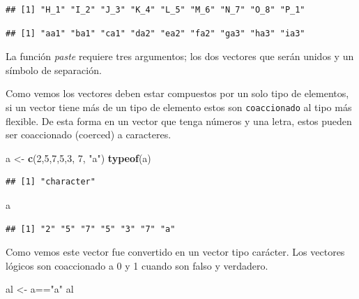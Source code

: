 \documentclass[]{article}
\newenvironment{Shaded}{\begin{snugshade}}{\end{snugshade}}
\newcommand{\KeywordTok}[1]{\textcolor[rgb]{0.13,0.29,0.53}{\textbf{{#1}}}}
\newcommand{\DecValTok}[1]{\textcolor[rgb]{0.00,0.00,0.81}{{#1}}}
\newcommand{\StringTok}[1]{\textcolor[rgb]{0.31,0.60,0.02}{{#1}}}
\newcommand{\NormalTok}[1]{{#1}}
\begin{document}
\begin{verbatim}
## [1] "H_1" "I_2" "J_3" "K_4" "L_5" "M_6" "N_7" "O_8" "P_1"
\end{verbatim}

\begin{verbatim}
## [1] "aa1" "ba1" "ca1" "da2" "ea2" "fa2" "ga3" "ha3" "ia3"
\end{verbatim}

La función \emph{paste} requiere tres argumentos; los dos vectores que
serán unidos y un símbolo de separación.

Como vemos los vectores deben estar compuestos por un solo tipo de
elementos, si un vector tiene más de un tipo de elemento estos son
\texttt{coaccionado} al tipo más flexible. De esta forma en un vector
que tenga números y una letra, estos pueden ser coaccionado (coerced) a
caracteres.

\begin{Shaded}
\begin{Highlighting}[]
\NormalTok{a <-}\StringTok{ }\KeywordTok{c}\NormalTok{(}\DecValTok{2}\NormalTok{,}\DecValTok{5}\NormalTok{,}\DecValTok{7}\NormalTok{,}\DecValTok{5}\NormalTok{,}\DecValTok{3}\NormalTok{, }\DecValTok{7}\NormalTok{, }\StringTok{"a"}\NormalTok{)}
\KeywordTok{typeof}\NormalTok{(a)}
\end{Highlighting}
\end{Shaded}

\begin{verbatim}
## [1] "character"
\end{verbatim}

\begin{Shaded}
\begin{Highlighting}[]
\NormalTok{a}
\end{Highlighting}
\end{Shaded}

\begin{verbatim}
## [1] "2" "5" "7" "5" "3" "7" "a"
\end{verbatim}

Como vemos este vector fue convertido en un vector tipo carácter. Los
vectores lógicos son coaccionado a 0 y 1 cuando son falso y verdadero.

\begin{Shaded}
\begin{Highlighting}[]
\NormalTok{al <-}\StringTok{ }\NormalTok{a==}\StringTok{"a"}
\NormalTok{al}
\end{Highlighting}
\end{Shaded}
\end{document}
